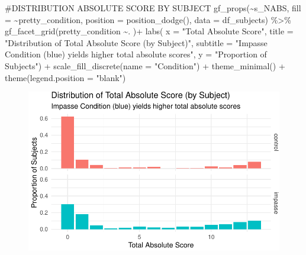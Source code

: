 \documentclass[
  letterpaper,
  DIV=11,
  numbers=noendperiod]{scrreprt}
\newenvironment{Shaded}{\begin{snugshade}}{\end{snugshade}}
\newcommand{\AttributeTok}[1]{\textcolor[rgb]{0.40,0.45,0.13}{#1}}
\newcommand{\CommentTok}[1]{\textcolor[rgb]{0.37,0.37,0.37}{#1}}
\newcommand{\FunctionTok}[1]{\textcolor[rgb]{0.28,0.35,0.67}{#1}}
\newcommand{\NormalTok}[1]{\textcolor[rgb]{0.00,0.23,0.31}{#1}}
\newcommand{\SpecialCharTok}[1]{\textcolor[rgb]{0.37,0.37,0.37}{#1}}
\newcommand{\StringTok}[1]{\textcolor[rgb]{0.13,0.47,0.30}{#1}}
\begin{document}
\begin{Shaded}
\begin{Highlighting}[]
\CommentTok{\#DISTRIBUTION ABSOLUTE SCORE BY SUBJECT}
\FunctionTok{gf\_props}\NormalTok{(}\SpecialCharTok{\textasciitilde{}}\NormalTok{s\_NABS, }\AttributeTok{fill =} \SpecialCharTok{\textasciitilde{}}\NormalTok{pretty\_condition, }\AttributeTok{position =} \FunctionTok{position\_dodge}\NormalTok{(), }\AttributeTok{data =}\NormalTok{ df\_subjects) }\SpecialCharTok{\%\textgreater{}\%} 
\FunctionTok{gf\_facet\_grid}\NormalTok{(pretty\_condition }\SpecialCharTok{\textasciitilde{}}\NormalTok{. )}\SpecialCharTok{+}
  \FunctionTok{labs}\NormalTok{( }\AttributeTok{x =} \StringTok{"Total Absolute Score"}\NormalTok{, }
        \AttributeTok{title =} \StringTok{"Distribution of Total Absolute Score (by Subject)"}\NormalTok{,}
        \AttributeTok{subtitle =} \StringTok{"Impasse Condition (blue) yields higher total absolute scores"}\NormalTok{,}
        \AttributeTok{y =} \StringTok{"Proportion of Subjects"}\NormalTok{) }\SpecialCharTok{+}
  \FunctionTok{scale\_fill\_discrete}\NormalTok{(}\AttributeTok{name =} \StringTok{"Condition"}\NormalTok{) }\SpecialCharTok{+}  
  \FunctionTok{theme\_minimal}\NormalTok{() }\SpecialCharTok{+} \FunctionTok{theme}\NormalTok{(}\AttributeTok{legend.position =} \StringTok{"blank"}\NormalTok{)}
\end{Highlighting}
\end{Shaded}

\begin{figure}[H]

{\centering \includegraphics{analysis/SGC3A/2_sgc3A_scoring_files/figure-pdf/DISTR-ABSCORE-3.pdf}

}

\end{figure}
\end{document}
